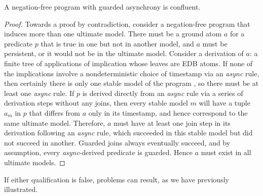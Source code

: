 \begin{lemma}
\label{lem:guarding}
A negation-free \lang program with guarded asynchrony is confluent.
\end{lemma}
\begin{proof}


Towards a proof by contradiction, consider a negation-free \lang program that 
induces more than one ultimate model.  There must be a ground atom $a$ for a predicate $p$
that is true in one but
not in another model, and $a$ must be persistent, or it would not be
in the ultimate model.  Consider a derivation of $a$: a finite tree of applications of
implication whose leaves are EDB atoms.  If none of the implications involve a nondeterministic
choice of timestamp via an {\em async} rule, then certainly there is only one stable model of the
program , so there must be at least one {\em async} rule.  If $p$ is derived directly from 
an {\em async} rule via a series of derivation steps without any joins, then every stable
model $m$ will have a tuple $a_m$ in $p$ that differs from $a$ only in its timestamp, 
and hence correspond to the same ultimate model.
Therefore, $a$ must have at least one join step in its derivation following an {\em async} rule,
which succeeded in this stable model but did not succeed in another.  Guarded joins always
eventually succeed, and by assumption, every {\em async}-derived predicate is guarded.
Hence $a$ must exist in all ultimate models.

\end{proof}


If either qualification is false, problems can result, as we have previously illustrated.


